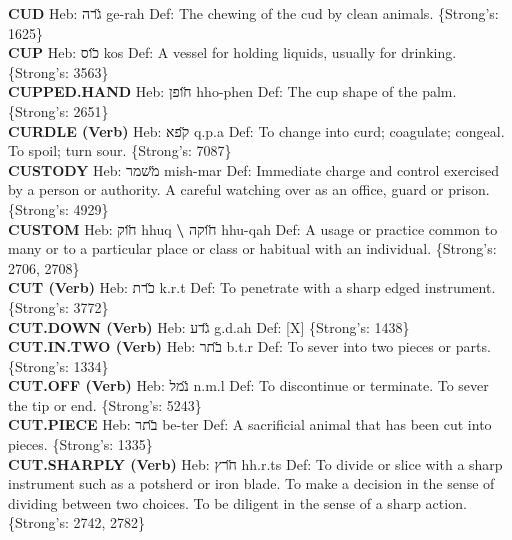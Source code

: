 {\textbf{CUD} Heb: {\large\H גרה} ge-rah Def: The chewing of the cud by clean animals. \{Strong's: 1625\}\hfill{}\\

\textbf{CUP} Heb: {\large\H כוס} kos Def: A vessel for holding liquids, usually for drinking. \{Strong's: 3563\}\hfill{}\\

\textbf{CUPPED.HAND} Heb: {\large\H חופן} hho-phen Def: The cup shape of the palm. \{Strong's: 2651\}\hfill{}\\

\textbf{CURDLE (Verb)} Heb: {\large\H קפא} q.p.a Def: To change into curd; coagulate; congeal. To spoil; turn sour. \{Strong's: 7087\}\hfill{}\\

\textbf{CUSTODY} Heb: {\large\H משמר} mish-mar Def: Immediate charge and control exercised by a person or authority. A careful watching over as an office, guard or prison. \{Strong's: 4929\}\hfill{}\\

\textbf{CUSTOM} Heb: {\large\H חוק} hhuq \textbf{\textbackslash{}} {\large\H חוקה} hhu-qah Def: A usage or practice common to many or to a particular place or class or habitual with an individual. \{Strong's: 2706, 2708\}\hfill{}\\

\textbf{CUT (Verb)} Heb: {\large\H כרת} k.r.t Def: To penetrate with a sharp edged instrument. \{Strong's: 3772\}\hfill{}\\

\textbf{CUT.DOWN (Verb)} Heb: {\large\H גדע} g.d.ah Def: {[}X{]} \{Strong's: 1438\}\hfill{}\\

\textbf{CUT.IN.TWO (Verb)} Heb: {\large\H בתר} b.t.r Def: To sever into two pieces or parts. \{Strong's: 1334\}\hfill{}\\

\textbf{CUT.OFF (Verb)} Heb: {\large\H נמל} n.m.l Def: To discontinue or terminate. To sever the tip or end. \{Strong's: 5243\}\hfill{}\\

\textbf{CUT.PIECE} Heb: {\large\H בתר} be-ter Def: A sacrificial animal that has been cut into pieces. \{Strong's: 1335\}\hfill{}\\

\textbf{CUT.SHARPLY (Verb)} Heb: {\large\H חרץ} hh.r.ts Def: To divide or slice with a sharp instrument such as a potsherd or iron blade. To make a decision in the sense of dividing between two choices. To be diligent in the sense of a sharp action. \{Strong's: 2742, 2782\}\hfill{}\\

}
